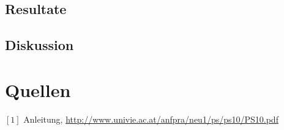 \documentclass[12pt,a4paper]{article}
\begin{document}
\begin{multicols}{2}
\subsection{Resultate}

\subsection{Diskussion}


\section{Quellen}
$[1]$ Anleitung, \url{http://www.univie.ac.at/anfpra/neu1/ps/ps10/PS10.pdf}\\

\end{multicols}
\end{document}
